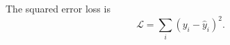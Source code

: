 The squared error loss is
\begin{equation}
\mathcal{L} = \sum_i (y_i - \hat{y}_i)^2.
\label{eq:mse}
\end{equation}

